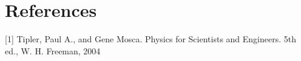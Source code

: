 \section{References}\label{sec:References}

[1] Tipler, Paul A., and Gene Mosca. Physics for Scientists and Engineers. 5th ed., W. H. Freeman, 2004
